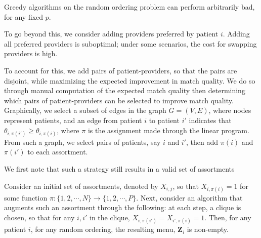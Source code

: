 \begin{lemma}
    Greedy algorithms on the random ordering problem can perform arbitrarily bad, for any fixed $p$. 
\end{lemma}


To go beyond this, we consider adding providers preferred by patient $i$. 
Adding all preferred providers is suboptimal; under some scenarios, the cost for swapping providers is high. 

To account for this, we add pairs of patient-providers, so that the pairs are disjoint, while maximizing the expected improvement in match quality. 
We do so through manual computation of the expected match quality then determining which pairs of patient-providers can be selected to improve match quality. 
Graphically, we select a subset of edges in the graph $G=(V,E)$, where nodes represent patients, and an edge from patient $i$ to patient $i'$ indicates that $\theta_{i,\pi(i')} \geq \theta_{i,\pi(i)}$, where $\pi$ is the assignment made through the linear program. 
From such a graph, we select pairs of patients, say $i$ and $i'$, then add $\pi(i)$ and $\pi(i')$ to each assortment. 

We first note that such a strategy still results in a valid set of assortments
\begin{lemma}
    Consider an initial set of assortments, denoted by $X_{i,j}$, so that $X_{i,\pi(i)} = 1$ for some function $\pi: \{1,2,\cdots,N\} \rightarrow \{1,2,\cdots,P\}$. 
    Next, consider an algorithm that augments such an assortment through the following: at each step, a clique is chosen, so that for any $i,i'$ in the clique, $X_{i,\pi(i')} = X_{i',\pi(i)} = 1$. Then, for any patient $i$, for any random ordering, the resulting menu, $\mathbf{Z}_{i}$ is non-empty. 
\end{lemma}

